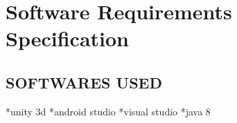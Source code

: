 \chapter{Software Requirements Specification}
\section{SOFTWARES USED}
 *unity 3d
*android studio
*visual studio
*java 8